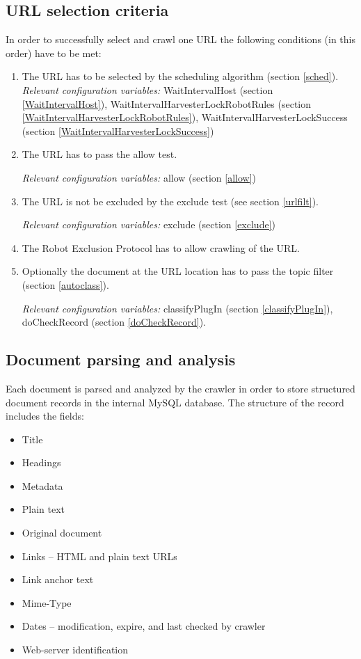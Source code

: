 \subsection{URL selection criteria}
In order to successfully select and crawl one URL the following conditions
(in this order) have to be met:
\begin{enumerate}
\item The URL has to be selected by the scheduling algorithm (section
\ref{sched}).\\

{\em Relevant configuration variables:}
WaitIntervalHost (section \ref{WaitIntervalHost}),
WaitIntervalHarvesterLockRobotRules (section \ref{WaitIntervalHarvesterLockRobotRules}),
WaitIntervalHarvesterLockSuccess (section \ref{WaitIntervalHarvesterLockSuccess})

\item The URL has to pass the allow test.

{\em Relevant configuration variables:} allow (section \ref{allow})

\item The URL is not be excluded by the exclude test (see section
\ref{urlfilt}).

{\em Relevant configuration variables:} exclude (section \ref{exclude})

\item The Robot Exclusion Protocol has to allow crawling of the URL.

\item Optionally the document at the URL location has to pass the topic filter
(section \ref{autoclass}).


{\em Relevant configuration variables:}
classifyPlugIn (section \ref{classifyPlugIn}),
doCheckRecord (section \ref{doCheckRecord}).

\end{enumerate}

\subsection{Document parsing and analysis}

Each document is parsed and analyzed by the crawler in order to store
structured document records in the internal MySQL database. The
structure of the record includes the fields:
\begin{itemize}
\item Title
\item Headings
\item Metadata
\item Plain text
\item Original document
\item Links -- HTML and plain text URLs
\item Link anchor text
\item Mime-Type
\item Dates -- modification, expire, and last checked by crawler
\item Web-server identification
\end{itemize}

